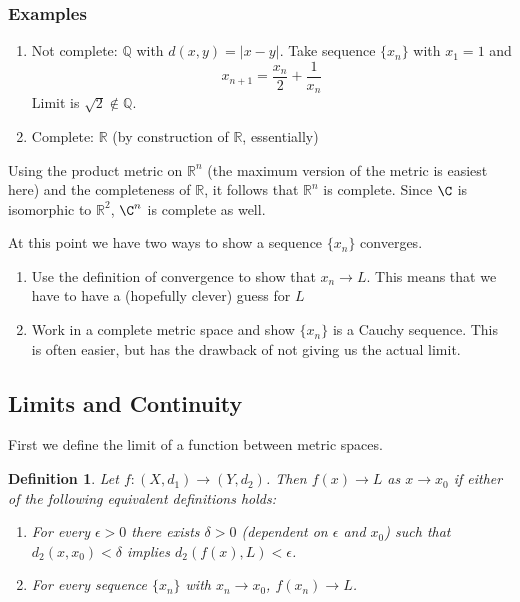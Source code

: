 \documentclass[10pt]{article}         %
\newtheorem{definition}{Definition}[section]
\theoremstyle{remark}
\newcommand{\R}{\mathbb{R}}
\newcommand{\Q}{\mathbb{Q}}
\begin{document}
\subsubsection{Examples}

\begin{enumerate}
\item Not complete: $\mathbb{Q}$ with $d(x,y) = |x-y|$. Take sequence $\{x_n\}$ with $x_1 = 1$ and 
\[
x_{n+1} = \frac{x_n}{2} + \frac{1}{x_n}
\]
Limit is $\sqrt{2} \notin \Q$.
\item Complete: $\mathbb{R}$ (by construction of $\R$, essentially)
\end{enumerate}

Using the product metric on $\R^n$ (the maximum version of the metric is easiest here) and the completeness of $\R$, it follows that $\R^n$ is complete. Since $\C$ is isomorphic to $\R^2$, $\C^n$ is complete as well.

At this point we have two ways to show a sequence $\{x_n\}$ converges.
\begin{enumerate}
    \item Use the definition of convergence to show that $x_n \rightarrow L$. This means that we have to have a (hopefully clever) guess for $L$
    \item Work in a complete metric space and show $\{x_n\}$ is a Cauchy sequence. This is often easier, but has the drawback of not giving us the actual limit.
\end{enumerate}

\subsection{Limits and Continuity}

First we define the limit of a function between metric spaces. 

\begin{definition}Let $f: (X, d_1) \rightarrow (Y, d_2)$. Then $f(x) \rightarrow L$ as $x \rightarrow x_0$ if either of the following equivalent definitions holds:
\begin{enumerate}
\item For every $\epsilon > 0$ there exists $\delta > 0$ (dependent on $\epsilon$ and $x_0$) such that $d_2(x, x_0) < \delta$ implies $d_2(f(x), L) < \epsilon$.
\item For every sequence $\{x_n\}$ with $x_n \rightarrow x_0$, $f(x_n) \rightarrow L$.
\end{enumerate}
\end{definition}
\end{document}
